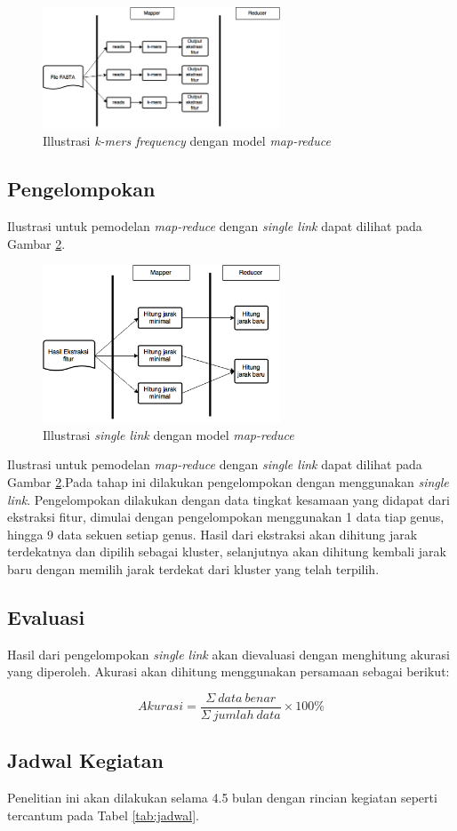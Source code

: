 \begin{figure}[h!]\centering %
	\includegraphics[width=200pt]{kmers.png}
	\caption{Illustrasi \textit{k-mers frequency} dengan model \textit{map-reduce}}
	\label{fig:kmers}
\end{figure}

\subsection*{Pengelompokan}
Ilustrasi untuk pemodelan \textit{map-reduce} dengan \textit{single link} dapat dilihat  pada Gambar \ref{fig:single}.
\begin{figure}[h!]\centering %
	\includegraphics[width=200pt]{single.png}
	\caption{Illustrasi \textit{single link} dengan model \textit{map-reduce}}
	\label{fig:single}
\end{figure}
Ilustrasi untuk pemodelan \textit{map-reduce} dengan \textit{single link} dapat dilihat  pada Gambar \ref{fig:single}.Pada tahap ini dilakukan pengelompokan dengan menggunakan \textit{single link}. Pengelompokan dilakukan dengan data tingkat kesamaan yang didapat dari ekstraksi fitur, dimulai dengan pengelompokan menggunakan 1 data tiap genus, hingga 9 data sekuen setiap genus. Hasil dari ekstraksi akan dihitung jarak terdekatnya dan dipilih sebagai kluster, selanjutnya akan dihitung kembali jarak baru dengan memilih jarak terdekat dari kluster yang telah terpilih. 



\subsection*{Evaluasi}
Hasil dari pengelompokan \textit{single link} akan dievaluasi dengan menghitung akurasi yang diperoleh. Akurasi  akan dihitung menggunakan persamaan sebagai berikut:

\begin{equation}
Akurasi = \dfrac{\Sigma{\ data\ benar}}{\Sigma{\ jumlah\ data}}\times 100\%
\label{eq:persamaan1}
\end{equation}

\subsection*{Jadwal Kegiatan}
Penelitian ini akan dilakukan selama 4.5 bulan dengan rincian kegiatan seperti tercantum pada Tabel \ref{tab:jadwal}.

